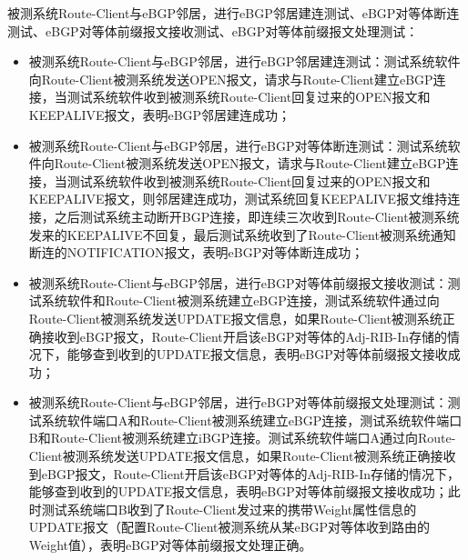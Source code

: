 被测系统Route-Client与eBGP邻居，进行eBGP邻居建连测试、eBGP对等体断连测试、eBGP对等体前缀报文接收测试、eBGP对等体前缀报文处理测试：
\begin{itemize}
  \item 被测系统Route-Client与eBGP邻居，进行eBGP邻居建连测试：测试系统软件向Route-Client被测系统发送OPEN报文，请求与Route-Client建立eBGP连接，当测试系统软件收到被测系统Route-Client回复过来的OPEN报文和KEEPALIVE报文，表明eBGP邻居建连成功；
  \item 被测系统Route-Client与eBGP邻居，进行eBGP对等体断连测试：测试系统软件向Route-Client被测系统发送OPEN报文，请求与Route-Client建立eBGP连接，当测试系统软件收到被测系统Route-Client回复过来的OPEN报文和KEEPALIVE报文，则邻居建连成功，测试系统回复KEEPALIVE报文维持连接，之后测试系统主动断开BGP连接，即连续三次收到Route-Client被测系统发来的KEEPALIVE不回复，最后测试系统收到了Route-Client被测系统通知断连的NOTIFICATION报文，表明eBGP对等体断连成功；
  \item 被测系统Route-Client与eBGP邻居，进行eBGP对等体前缀报文接收测试：测试系统软件和Route-Client被测系统建立eBGP连接，测试系统软件通过向Route-Client被测系统发送UPDATE报文信息，如果Route-Client被测系统正确接收到eBGP报文，Route-Client开启该eBGP对等体的Adj-RIB-In存储的情况下，能够查到收到的UPDATE报文信息，表明eBGP对等体前缀报文接收成功；
  \item 被测系统Route-Client与eBGP邻居，进行eBGP对等体前缀报文处理测试：测试系统软件端口A和Route-Client被测系统建立eBGP连接，测试系统软件端口B和Route-Client被测系统建立iBGP连接。测试系统软件端口A通过向Route-Client被测系统发送UPDATE报文信息，如果Route-Client被测系统正确接收到eBGP报文，Route-Client开启该eBGP对等体的Adj-RIB-In存储的情况下，能够查到收到的UPDATE报文信息，表明eBGP对等体前缀报文接收成功；此时测试系统端口B收到了Route-Client发过来的携带Weight属性信息的UPDATE报文（配置Route-Client被测系统从某eBGP对等体收到路由的Weight值），表明eBGP对等体前缀报文处理正确。\\
\end{itemize}


